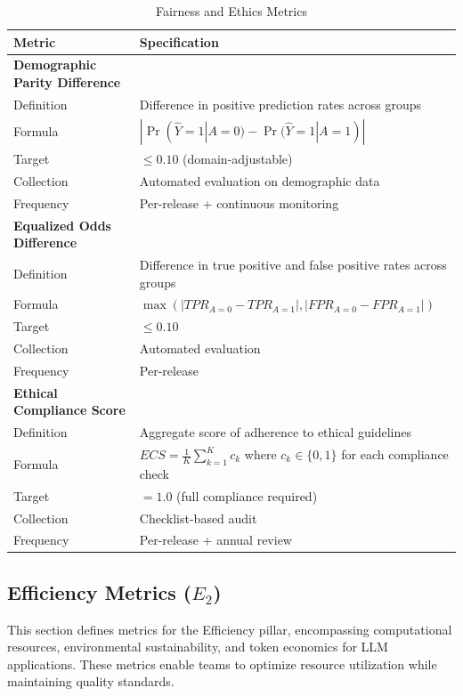 \begin{table}[!htbp]
\centering
\caption{Fairness and Ethics Metrics}
\label{tab:fairness_metrics}
\small
\begin{tabularx}{\linewidth}{@{}l X@{}}
\toprule
\textbf{Metric} & \textbf{Specification} \\
\midrule
\textbf{Demographic Parity Difference} & \\
Definition & Difference in positive prediction rates across groups \\
Formula & $|\Pr(\hat{Y}=1|A=0) - \Pr(\hat{Y}=1|A=1)|$ \\
Target & $\leq 0.10$ (domain-adjustable) \\
Collection & Automated evaluation on demographic data \\
Frequency & Per-release + continuous monitoring \\
\addlinespace

\textbf{Equalized Odds Difference} & \\
Definition & Difference in true positive and false positive rates across groups \\
Formula & $\max(|TPR_{A=0} - TPR_{A=1}|, |FPR_{A=0} - FPR_{A=1}|)$ \\
Target & $\leq 0.10$ \\
Collection & Automated evaluation \\
Frequency & Per-release \\
\addlinespace

\textbf{Ethical Compliance Score} & \\
Definition & Aggregate score of adherence to ethical guidelines \\
Formula & $ECS = \frac{1}{K}\sum_{k=1}^{K} c_k$ where $c_k \in \{0,1\}$ for each compliance check \\
Target & $= 1.0$ (full compliance required) \\
Collection & Checklist-based audit \\
Frequency & Per-release + annual review \\
\bottomrule
\end{tabularx}
\end{table}

\subsection{Efficiency Metrics (\texorpdfstring{$E_2$}{E2})}

This section defines metrics for the Efficiency pillar, encompassing computational resources, environmental sustainability, and token economics for LLM applications. These metrics enable teams to optimize resource utilization while maintaining quality standards.

